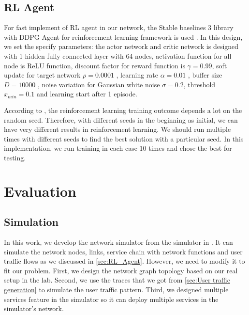 \documentclass[conference]{IEEEtran}
\begin{document}
\subsection{RL Agent}
For fast implement of RL agent in our network, the Stable baselines 3 library with DDPG Agent for reinforcement learning framework is used \cite{stable-baselines3}. In this design, we set the specify parameters: the actor network and critic network is designed with 1 hidden fully connected layer with 64 nodes, activation function for all node is ReLU function, discount factor for reward function is $\gamma = 0.99$, soft update for target network $\rho = 0.0001$ , learning rate $\alpha = 0.01$ , buffer size $D = 10000$ , noise variation for Gaussian white noise $\sigma = 0.2$, threshold $x_{min} = 0.1$ and learning start after 1 episode.

According to \cite{rlblogpost}, the reinforcement learning training outcome depends a lot on the random seed. Therefore, with different seeds in the beginning as initial, we can have very different results in reinforcement learning. We should run multiple times with different seeds to find the best solution with a particular seed. In this implementation, we run training in each case 10 times and chose the best for testing. 

\section{Evaluation}
\label{sec:Evaluation}
\subsection{Simulation}
In this work, we develop the network simulator from the simulator in \cite{9269087}. It can simulate the network nodes, links, service chain with network functions and user traffic flows as we discussed in \ref{sec:RL_Agent}. However, we need to modify it to fit our problem. First, we design the network graph topology based on our real setup in the lab. Second, we use the traces that we got from \ref{sec:User traffic generation} to simulate the user traffic pattern. Third, we designed multiple services feature in the simulator so it can deploy multiple services in the simulator's network.
\end{document}
